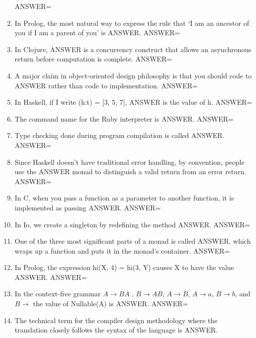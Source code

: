 \documentclass{exam}
\begin{document}
\begin{enumerate}
ANSWER=
\item In Prolog, the most natural way to express the rule that `I am an ancestor of you if I am a parent of you' is ANSWER.\newline
ANSWER=
\item In Clojure, ANSWER is a concurrency construct that allows an asynchronous return before computation is complete.\newline
ANSWER=
\item A major claim in object-oriented design philosophy is that you should code to ANSWER rather than code to implementation.\newline
ANSWER=
\item In Haskell, if I write (h:t) = $\lbrack$3, 5, 7$\rbrack$, ANSWER is the value of h.\newline
ANSWER=
\item The command name for the Ruby interpreter is ANSWER.\newline
ANSWER=
\item Type checking done during program compilation is called ANSWER.\newline
ANSWER=
\item Since Haskell doesn't have traditional error handling, by convention, people use the ANSWER monad to distinguish a valid return from an error return.\newline
ANSWER=
\item In C, when you pass a function as a parameter to another function, it is implemented as passing ANSWER.\newline
ANSWER=
\item In Io, we create a singleton by redefining the method ANSWER.\newline
ANSWER=
\item One of the three most significant parts of a monad is called ANSWER, which wraps up a function and puts it in the monad's container.\newline
ANSWER=
\item In Prolog, the expression hi(X, 4) = hi(3, Y) causes X to have the value ANSWER.\newline
ANSWER=
\item In the context-free grammar $A \rightarrow B A$ , $B \rightarrow A B$, $A \rightarrow B$, $A \rightarrow a$, $B \rightarrow b$, and $B \rightarrow$  the value of Nullable(A) is ANSWER.\newline
ANSWER=
\item The technical term for the compiler design methodology where the translation closely follows the syntax of the language is ANSWER.\newline

\end{enumerate}
\end{document}
